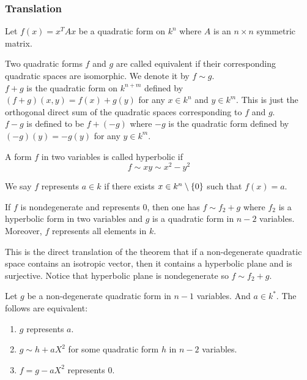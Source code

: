 \documentclass[15pt]{scrartcl}
\begin{document}
\subsubsection*{Translation}
Let $f(x)=x^TAx$ be a quadratic form on $k^n$ where $A$ is an $n\times n$  symmetric matrix. 
\begin{definition}
    Two quadratic forms $f$ and $g$ are called equivalent if their corresponding quadratic spaces are isomorphic. We denote it by $f\sim g$.
    \\

    $f+g$ is the quadratic form on $k^{n+m}$ defined by $(f+g)(x,y)=f(x)+g(y)$ for any $x\in k^n$ and $y\in k^m$. This is just the orthogonal direct sum of the quadratic spaces corresponding to $f$ and $g$.
    \\

    $f-g$ is defined to be $f+(-g)$ where $-g$ is the quadratic form defined by $(-g)(y)=-g(y)$ for any $y\in k^m$.
\end{definition}
\begin{definition}
    A form $f$ in two variables is called hyperbolic if 
    \[f\sim xy\sim x^2-y^2\]
\end{definition}
\begin{definition}
    We say $f$ represents $a\in k$ if there exists $x\in k^n\setminus \{0\} $ such that $f(x)=a$. 
\end{definition}
\begin{proposition}
    If $f$ is nondegenerate and represents $0$, then one has $f\sim f_2+g$ where $f_2$ is a hyperbolic form in two variables and $g$ is a quadratic form in $n-2$ variables. Moreover, $f$ represents all elements in $k$.
\end{proposition}
This is the direct translation of the theorem that if a non-degenerate quadratic space contains an isotropic vector, then it contains a hyperbolic plane and is surjective. Notice that hyperbolic plane is nondegenerate so $f\sim f_2+g$. 
\begin{proposition}
    Let $g$ be a non-degenerate quadratic form in $n-1$ variables. And $a\in k^*$. The follows are equivalent:
\begin{enumerate}
    \item $g$ represents $a$. 
    \item $g\sim h+aX^2$ for some quadratic form $h$ in $n-2$ variables.
    \item $f=g-aX^2$ represents $0$. 
\end{enumerate}
\end{proposition}
\end{document}
